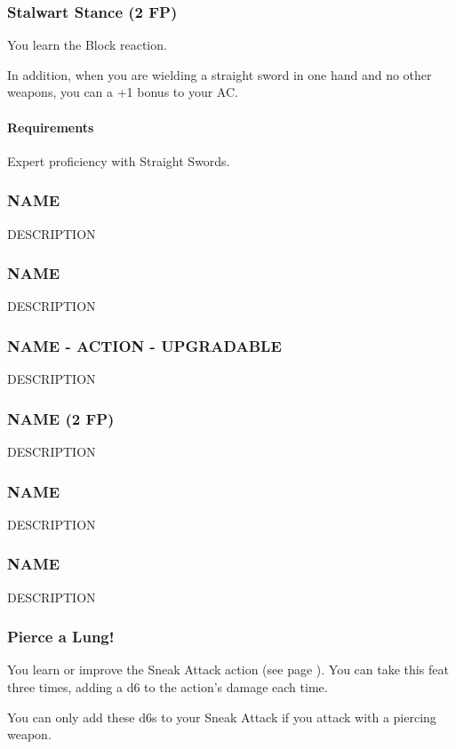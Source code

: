 \subsubsection{Stalwart Stance (2 FP)} \label{feat::stalwartstance}
    You learn the Block reaction.

    In addition, when you are wielding a straight sword in one hand and no other weapons, you can a +1 bonus to your AC.
    \paragraph{Requirements} Expert proficiency with Straight Swords.

\subsubsection{NAME} \label{feat::name}
    DESCRIPTION
\subsubsection{NAME} \label{feat::name}
    DESCRIPTION
\subsubsection{NAME - ACTION - UPGRADABLE} \label{feat::name}
    DESCRIPTION
\subsubsection{NAME (2 FP)} \label{feat::name}
    DESCRIPTION
\subsubsection{NAME} \label{feat::name}
    DESCRIPTION
\subsubsection{NAME} \label{feat::name}
    DESCRIPTION
\subsubsection{Pierce a Lung!} \label{feat::piercealung}
    You learn or improve the Sneak Attack action (see page \pageref{act:sneakattack}).
    You can take this feat three times, adding a d6 to the action's damage each time.

    You can only add these d6s to your Sneak Attack if you attack with a piercing weapon.
